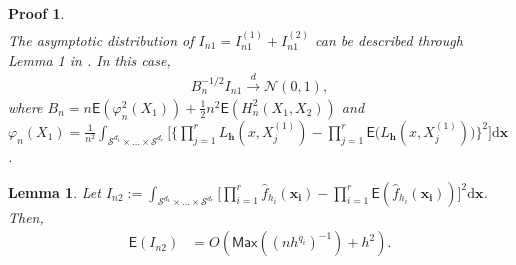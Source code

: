 \documentclass{article}
\newtheorem{lemma}{Lemma}[section]
\newtheorem{Proof}{Proof}[section]
\begin{document}
\begin{Proof}
\begin{align}
\end{align}
The asymptotic distribution of $I_{n1} = I_{n1}^{(1)} + I_{n1}^{(2)}$ can be described through Lemma 1 in \cite{Garc_a_Portugu_es_2015}. In this case,
\begin{align}
    B_n^{-1/2} I_{n1} \xrightarrow{d} \mathcal{N}(0, 1),
\end{align}
where $B_n = n \mathsf{E} (\varphi_n^2(X_1)) + \frac{1}{2} n^2 \mathsf{E}(H_n^2(X_1,X_2))$ and $\varphi_n(X_1) = \frac{1}{n^2} \int_{\mathcal{S}^{d_1} \times \dots \times \mathcal{S}^{d_r}} \Bigg[ \Bigg\{ \prod_{j=1}^{r} L_{\mathbf{h}} (x,X_j^{(1)}) - \prod_{j=1}^{r} \mathsf{E} \Big( L_{\mathbf{h}} (x,X_j^{(1)}) \Big) \Bigg\}^2 \Bigg] \mathrm{d} \mathbf{x}$.
\end{Proof}

\begin{lemma}
    Let $I_{n2} := \int_{\mathcal{S}^{d_1} \times \dots \times \mathcal{S}^{d_r}} \Big[ \prod_{i = 1}^{r} \hat{f}_{h_i}(\mathbf{x_i}) - \prod_{i = 1}^{r} \mathsf{E} (\hat{f}_{h_i} (\mathbf{x_i})) \Big]^2 \mathrm{d} \mathbf{x}$. Then,
    \begin{align}
        \mathsf{E} (I_{n2}) &=O(\mathsf{Max}((nh^{q_i})^{-1})+ h^2).
\end{align}
\end{lemma}
\end{document}
